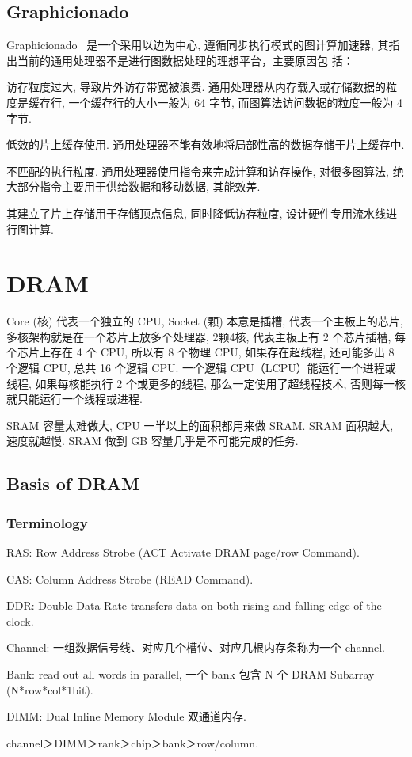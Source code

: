 \documentclass[UTF8,12pt,a4paper]{article}
\begin{document}
\subsection{Graphicionado}
Graphicionado~\cite{DBLP:conf/micro/HamWSSM16}
是一个采用以边为中心, 遵循同步执行模式的图计算加速器,
其指出当前的通用处理器不是进行图数据处理的理想平台，主要原因包
括：
\begin{compactitem}
  \item 访存粒度过大, 导致片外访存带宽被浪费.
  通用处理器从内存载入或存储数据的粒度是缓存行,
  一个缓存行的大小一般为 64 字节, 而图算法访问数据的粒度一般为 4 字节.
  \item 低效的片上缓存使用. 通用处理器不能有效地将局部性高的数据存储于片上缓存中.
  \item 不匹配的执行粒度. 通用处理器使用指令来完成计算和访存操作,
  对很多图算法, 绝大部分指令主要用于供给数据和移动数据, 其能效差.
\end{compactitem}
其建立了片上存储用于存储顶点信息, 同时降低访存粒度, 设计硬件专用流水线进行图计算.

\clearpage

\section{DRAM}
Core (核) 代表一个独立的 CPU, Socket (颗) 本意是插槽,
代表一个主板上的芯片, 多核架构就是在一个芯片上放多个处理器,
2颗4核, 代表主板上有 2 个芯片插槽, 每个芯片上存在 4 个 CPU, 所以有 8 个物理 CPU,
如果存在超线程, 还可能多出 8 个逻辑 CPU, 总共 16 个逻辑 CPU.
一个逻辑 CPU（LCPU）能运行一个进程或线程, 如果每核能执行 2 个或更多的线程,
那么一定使用了超线程技术, 否则每一核就只能运行一个线程或进程.

SRAM 容量太难做大, CPU 一半以上的面积都用来做 SRAM.
SRAM 面积越大, 速度就越慢.
SRAM 做到 GB 容量几乎是不可能完成的任务.

\subsection{Basis of DRAM}
\subsubsection{Terminology}
\begin{compactitem}
  \item RAS: Row Address Strobe (ACT Activate DRAM page/row Command).
  \item CAS: Column Address Strobe (READ Command).
  \item DDR: Double-Data Rate transfers data
  on both rising and falling edge of the clock.
  \item Channel: 一组数据信号线、对应几个槽位、对应几根内存条称为一个 channel.
  \item Bank: read out all words in parallel, 一个 bank 包含 N 个 DRAM Subarray (N*row*col*1bit).
  \item DIMM: Dual Inline Memory Module 双通道内存.
  \item channel＞DIMM＞rank＞chip＞bank＞row/column.
\end{compactitem}
\end{document}
